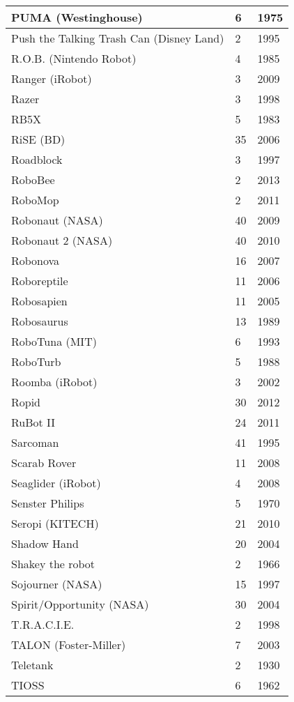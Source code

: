 \begin{longtable}{l | l | l }
PUMA (Westinghouse) \cite{robotpuma239137}	&	6	&	1975	\\	\hline
Push the Talking Trash Can (Disney Land)	&	2	&	1995	\\	\hline
R.O.B. (Nintendo Robot)	&	4	&	1985	\\	\hline
Ranger (iRobot)	&	3	&	2009	\\	\hline
Razer	&	3	&	1998	\\	\hline
RB5X	&	5	&	1983	\\	\hline
RiSE (BD)	&	35	&	2006	\\	\hline
Roadblock	&	3	&	1997	\\	\hline
RoboBee	&	2	&	2013	\\	\hline
RoboMop	&	2	&	2011	\\	\hline
Robonaut (NASA)	&	40	&	2009	\\	\hline
Robonaut 2 (NASA)	&	40	&	2010	\\	\hline
Robonova \cite{robotrobonova}	&	16	&	2007	\\	\hline
Roboreptile	&	11	&	2006	\\	\hline
Robosapien	&	11	&	2005	\\	\hline
Robosaurus	&	13	&	1989	\\	\hline
RoboTuna (MIT)	&	6	&	1993	\\	\hline
RoboTurb	&	5	&	1988	\\	\hline
Roomba (iRobot)	&	3	&	2002	\\	\hline
Ropid	&	30	&	2012	\\	\hline
RuBot II	&	24	&	2011	\\	\hline
Sarcoman	&	41	&	1995	\\	\hline
Scarab Rover	&	11	&	2008	\\	\hline
Seaglider (iRobot)	&	4	&	2008	\\	\hline
Senster Philips	&	5	&	1970	\\	\hline
Seropi (KITECH)	&	21	&	2010	\\	\hline
Shadow Hand	&	20	&	2004	\\	\hline
Shakey the robot	&	2	&	1966	\\	\hline
Sojourner (NASA)	&	15	&	1997	\\	\hline
Spirit/Opportunity (NASA)	&	30	&	2004	\\	\hline
T.R.A.C.I.E.	&	2	&	1998	\\	\hline
TALON (Foster-Miller)	&	7	&	2003	\\	\hline
Teletank \cite{robotTelitankSpringer2013military}	&	2	&	1930	\\	\hline
TIOSS	&	6	&	1962	\\	\hline

\end{longtable}
